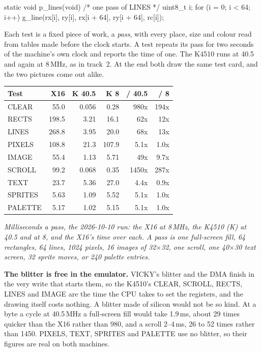 \begin{type}
static void p_lines(void)       /* one pass of LINES */
{
    uint8_t i;
    for (i = 0; i < 64; i++)
        g_line(rx[i], ry[i], rx[i + 64], ry[i + 64], rc[i]);
}
\end{type}

Each test is a fixed piece of work, a \emph{pass}, with every
place, size and colour read from tables made before the clock
starts. A test repeats its pass for two seconds of the
machine's own clock and reports the time of one. The K4510
runs at 40.5 and again at 8\,MHz, as in track~2. At the end
both draw the same test card, and the two pictures come out
alike.

\begin{center}
\footnotesize
\begin{tabular}{@{}l r r r r r@{}}
\toprule
\textbf{Test} & \textbf{X16} & \textbf{K 40.5} & \textbf{K 8} & \textbf{/ 40.5} & \textbf{/ 8} \\
\midrule
CLEAR & 55.0 & 0.056 & 0.28 & 980x & 194x \\
RECTS & 198.5 & 3.21 & 16.1 & 62x & 12x \\
LINES & 268.8 & 3.95 & 20.0 & 68x & 13x \\
PIXELS & 108.8 & 21.3 & 107.9 & 5.1x & 1.0x \\
IMAGE & 55.4 & 1.13 & 5.71 & 49x & 9.7x \\
SCROLL & 99.2 & 0.068 & 0.35 & 1450x & 287x \\
TEXT & 23.7 & 5.36 & 27.0 & 4.4x & 0.9x \\
SPRITES & 5.63 & 1.09 & 5.52 & 5.1x & 1.0x \\
PALETTE & 5.17 & 1.02 & 5.15 & 5.1x & 1.0x \\
\bottomrule
\end{tabular}
\end{center}
\noindent\emph{Milliseconds a pass, the 2026-10-10 run: the X16 at
8\,MHz, the K4510 (K) at 40.5 and at 8, and the X16's time over each. A
pass is one full-screen fill, 64 rectangles, 64 lines, 1024 pixels,
16 images of 32$\times$32, one scroll, one 40$\times$30 text screen,
32 sprite moves, or 240 palette entries.}

\begin{aside}
\textbf{The blitter is free in the emulator.} VICKY's blitter
and the DMA finish in the very write that starts them, so the
K4510's CLEAR, SCROLL, RECTS, LINES and IMAGE are the time the
CPU takes to set the registers, and the drawing itself costs
nothing. A blitter made of silicon would not be so kind. At a
byte a cycle at 40.5\,MHz a full-screen fill would take
1.9\,ms, about 29 times quicker than the X16 rather than 980,
and a scroll 2--4\,ms, 26 to 52 times rather than 1450.
PIXELS, TEXT, SPRITES and PALETTE use no blitter, so their
figures are real on both machines.
\end{aside}

